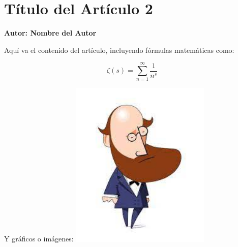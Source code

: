 \section{Título del Artículo 2}
\textbf{Autor: Nombre del Autor}

Aquí va el contenido del artículo, incluyendo fórmulas matemáticas como:

\[
\zeta(s) = \sum_{n=1}^{\infty}\frac{1}{n^s}
\]

Y gráficos o imágenes:
\includegraphics[width=0.5\textwidth]{images/article2/riemann.jpg}

\newpage